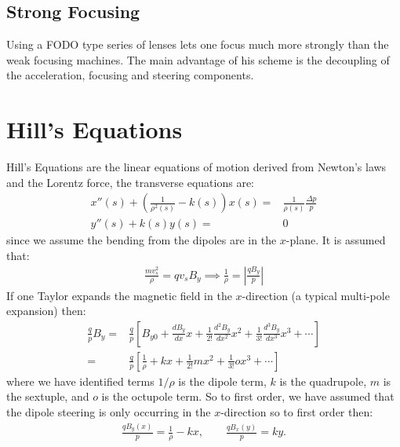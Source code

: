 \documentclass{article}
\numberwithin{equation}{section}
\begin{document}
\subsection{Strong Focusing}
Using a FODO type series of lenses lets one focus much more strongly than the weak focusing machines. The main advantage of his scheme is the decoupling of the acceleration, focusing and steering components.

\section{Hill's Equations}
Hill's Equations are the linear equations of motion derived from Newton's laws and the Lorentz force, the transverse equations are:
\begin{align}
x''(s) + \left( \frac{1}{\rho^2(s)} -k(s) \right) x(s) =& \frac{1}{\rho(s)}\frac{\Delta p}{p} \\
y''(s) + k(s) y(s) =& 0
\end{align}
since we assume the bending from the dipoles are in the $x$-plane. It is assumed that: 
\begin{align}
\frac{m v_s^2}{\rho} = qv_s B_y \implies \frac{1}{\rho} = \left| \frac{q B_y}{p} \right|
\end{align}
If one Taylor expands the magnetic field in the $x$-direction (a typical multi-pole expansion) then:
\begin{align}
\frac{q}{p} B_y =& \frac{q}{p} \left[ B_{y0} + \frac{dB_y}{dx} x + \frac{1}{2!}\frac{d^2 B_y}{dx^2} x^2 + \frac{1}{3!}\frac{d^3 B_y}{dx^3} x^3 + \cdots \right] \\
=& \frac{q}{p} \left[ \frac{1}{\rho} + k x + \frac{1}{2!} m x^2 + \frac{1}{3!} o x^3 + \cdots \right]
\end{align}
where we have identified terms $1/\rho$ is the dipole term, $k$ is the quadrupole, $m$ is the sextuple, and $o$ is the octupole term. So to first order, we have assumed that the dipole steering is only occurring in the $x$-direction so to first order then:
\begin{align}
\frac{qB_y(x)}{p} = \frac{1}{\rho} - kx ,\qquad \frac{qB_x(y)}{p} = ky .
\end{align}
\end{document}
